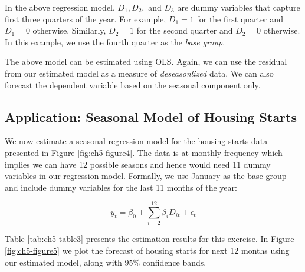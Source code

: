 \documentclass[]{book}
\theoremstyle{definition}
\theoremstyle{definition}
\theoremstyle{definition}
\theoremstyle{remark}
\begin{document}
In the above regression model, \(D_1,D_2,\) and \(D_3\) are dummy variables that capture first three quarters of the year. For example, \(D_1=1\) for the first quarter and \(D_1=0\) otherwise. Similarly, \(D_2=1\) for the second quarter and \(D_2=0\) otherwise. In this example, we use the fourth quarter as the \emph{base group}.

The above model can be estimated using OLS. Again, we can use the residual from our estimated model as a measure of \emph{deseasonlized} data. We can also forecast the dependent variable based on the seasonal component only.

\hypertarget{application-seasonal-model-of-housing-starts}{%
\subsection{Application: Seasonal Model of Housing Starts}\label{application-seasonal-model-of-housing-starts}}

We now estimate a seasonal regression model for the housing starts data presented in Figure \ref{fig:ch5-figure4}. The data is at monthly frequency which implies we can have 12 possible seasons and hence would need 11 dummy variables in our regression model. Formally, we use January as the base group and include dummy variables for the last 11 months of the year:

\begin{equation}
y_t=\beta_0 + \sum_{i=2}^{12}\beta_i D_{it} + \epsilon_t
\end{equation}

Table \ref{tab:ch5-table3} presents the estimation results for this exercise. In Figure \ref{fig:ch5-figure5} we plot the forecast of housing starts for next 12 months using our estimated model, along with 95\% confidence bands.
\end{document}
